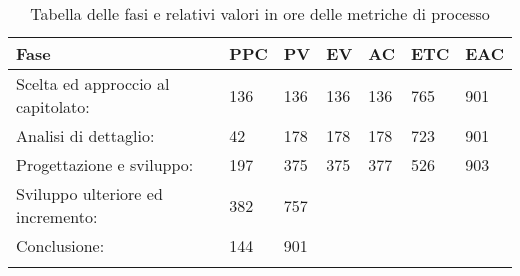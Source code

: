 

\begin{longtable}{f m m m m m m}  
			 Fase & PPC & PV & EV & AC & ETC & EAC \\
\endhead

Scelta ed approccio al capitolato: 	& 136 & 136 & 136 & 136 & 765 & 901 \\
\hline
Analisi di dettaglio: 				& 42  & 178 & 178 & 178 & 723 & 901 \\
\hline
Progettazione e sviluppo: 			& 197 & 375 & 375 & 377 & 526 & 903 \\
\hline
Sviluppo ulteriore ed incremento: 	& 382 & 757 \\
\hline
Conclusione: 						& 144 & 901 \\
\hline

\bottomrule
\caption{Tabella delle fasi e relativi valori in ore delle metriche di processo}
\end{longtable}